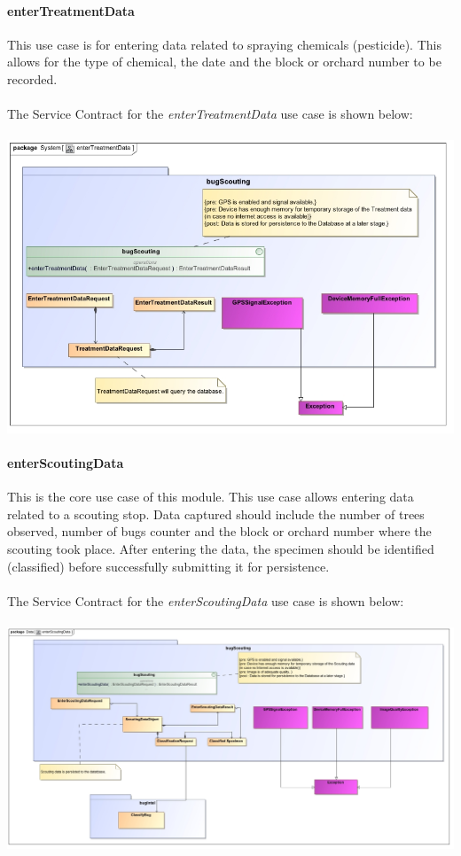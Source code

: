 \documentclass[11pt,a4paper,titlepage]{article}
\begin{document}
		\paragraph{enterTreatmentData }
		This use case is for entering data related to spraying chemicals (pesticide). This allows for the type of chemical, the date and the block or orchard number to be recorded.\\\hfill\\
		
		The Service Contract for the \textit{enterTreatmentData} use case is shown below:\\\hfill\\
		\includegraphics[width=\linewidth]{EnterTreatmentData}
		
		\paragraph{enterScoutingData }
		This is the core use case of this module. This use case allows entering data related to a scouting stop. Data captured should include the number of trees observed, number of bugs counter and the block or orchard number where the scouting took place. After entering the data, the specimen should be identified (classified) before successfully submitting it for persistence.\\\hfill\\
		The Service Contract for the \textit{enterScoutingData} use case is shown below:\\\hfill\\
		\includegraphics[width=\linewidth]{enterScoutingData}
		
\end{document}
